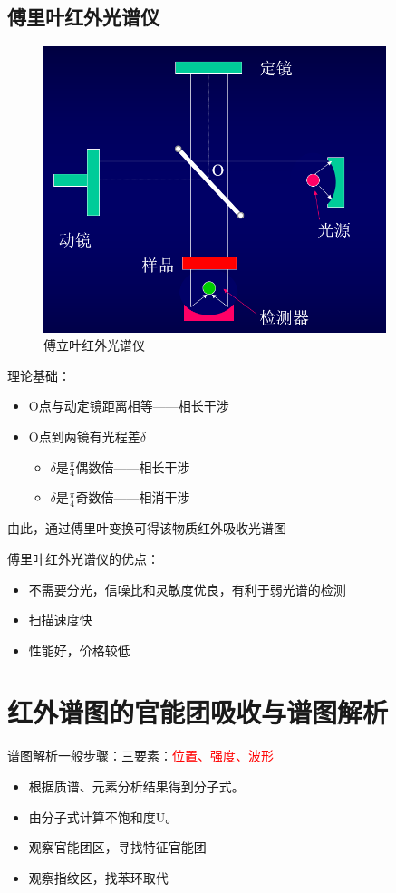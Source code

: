 \subsection{傅里叶红外光谱仪}
\begin{figure}[ht]
    \centering
    \includegraphics[width=10cm]{image/chp5_fur_ins.png}
    \caption{傅立叶红外光谱仪}
    \label{fig:fur_ins}
\end{figure}
理论基础：
\begin{itemize}
    \item O点与动定镜距离相等——相长干涉
    \item O点到两镜有光程差$\delta$
    \begin{itemize}
        \item $\delta$是$\frac{\pi}{4}$偶数倍——相长干涉
        \item $\delta$是$\frac{\pi}{4}$奇数倍——相消干涉
    \end{itemize}
\end{itemize}

由此，通过傅里叶变换可得该物质红外吸收光谱图
\begin{note}
    傅里叶红外光谱仪的优点：
    \begin{itemize}
        \item 不需要分光，信噪比和灵敏度优良，有利于弱光谱的检测
        \item 扫描速度快
        \item 性能好，价格较低
    \end{itemize}
\end{note}

\section{红外谱图的官能团吸收与谱图解析}
\begin{note}
	谱图解析一般步骤：三要素：\textcolor{red}{位置、强度、波形}
	\begin{itemize}
		\item 根据质谱、元素分析结果得到分子式。
		\item 由分子式计算不饱和度U。
		\item 观察官能团区，寻找特征官能团
		\item 观察指纹区，找苯环取代
	\end{itemize}
\end{note}

